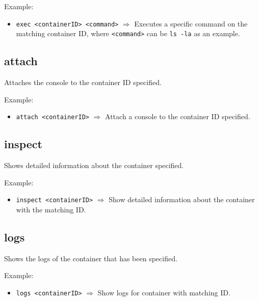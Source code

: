 \documentclass[a4paper, 12pt]{article}
\begin{document}
\vspace{0.5em}
Example:
\begin{itemize}
	\item \texttt{exec <containerID> <command>} $\Rightarrow$ Executes a
	specific command on the matching container ID, where \texttt{<command>} can
	be \texttt{ls -la} as an example.
\end{itemize}

\subsection{\label{sec:attach}attach}

Attaches the console to the container ID specified.

\vspace{0.5em}
Example:
\begin{itemize}
	\item \texttt{attach <containerID>} $\Rightarrow$ Attach a console to the
	container ID specified.
\end{itemize}

\subsection{inspect}

Shows detailed information about the container specified.

\vspace{0.5em}
Example:
\begin{itemize}
	\item \texttt{inspect <containerID>} $\Rightarrow$ Show detailed information
	about the container with the matching ID.
\end{itemize}

\subsection{logs}

Shows the logs of the container that has been specified.

\vspace{0.5em}
Example:
\begin{itemize}
	\item \texttt{logs <containerID>} $\Rightarrow$ Show logs for container
	with matching ID.
\end{itemize}
\end{document}
